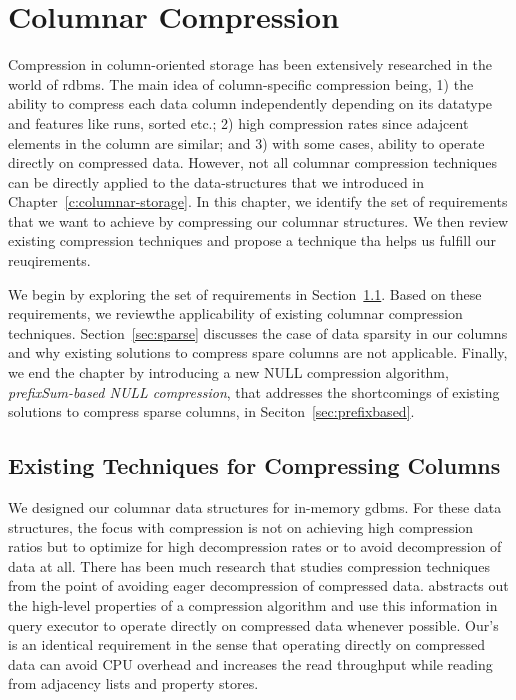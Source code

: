 \chapter{Columnar Compression}
\label{columnar-compression}

Compression in column-oriented storage has been extensively researched \cite{abadi-col-comp, abadi-sparse-col, boncz-comp} in the world of \gls{rdbms}. The main idea of column-specific compression being, 1) the ability to compress each data column independently depending on its datatype and features like runs, sorted etc.; 2) high compression rates since adajcent elements in the column are similar; and 3) with some cases, ability to operate directly on compressed data. However, not all columnar compression techniques can be directly applied to the data-structures that we introduced in Chapter~\ref{c:columnar-storage}. In this chapter, we identify the set of requirements that we want to achieve by compressing our columnar structures. We then review existing compression techniques and propose a technique tha helps us fulfill our reuqirements.

We begin by exploring the set of requirements in Section~\ref{sec:col-existing}. Based on these requirements, we reviewthe applicability of existing columnar compression techniques. Section~\ref{sec:sparse} discusses the case of data sparsity in our columns and why existing solutions to compress spare columns are not applicable. Finally, we end the chapter by introducing a new NULL compression algorithm, \emph{prefixSum-based NULL compression}, that addresses the shortcomings of existing solutions to compress sparse columns, in Seciton~\ref{sec:prefixbased}.

\section{Existing Techniques for Compressing Columns}
\label{sec:col-existing}

We designed our columnar data structures for in-memory \gls{gdbms}. For these data structures, the focus with compression is not on achieving high compression ratios but to optimize for high decompression rates or to avoid decompression of data at all. There has been much research that studies compression techniques from the point of avoiding eager decompression of compressed data. \cite{abadi-col-comp} abstracts out the high-level properties of a compression algorithm and use this information in query executor to operate directly on compressed data whenever possible. Our's is an identical requirement in the sense that operating directly on compressed data can avoid CPU overhead and increases the read throughput while reading from adjacency lists and property stores.


